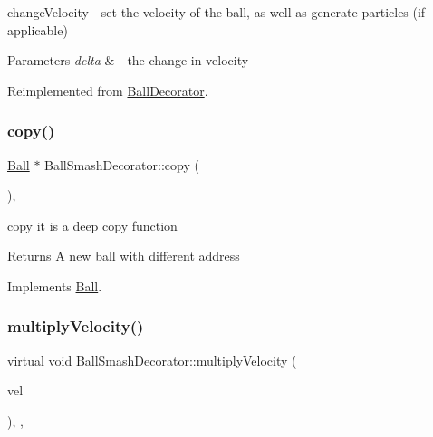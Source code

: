 change\+Velocity -\/ set the velocity of the ball, as well as generate particles (if applicable) 


\begin{DoxyParams}{Parameters}
{\em delta} & -\/ the change in velocity \\
\hline
\end{DoxyParams}


Reimplemented from \mbox{\hyperlink{class_ball_decorator_a3e4f4d31f6409f018b8b337bcf2bd284}{Ball\+Decorator}}.

\mbox{\label{class_ball_smash_decorator_ab5efc4c2f676224223940a7a4f7dcd77}} 
\subsubsection{\texorpdfstring{copy()}{copy()}}
{\footnotesize\ttfamily \mbox{\hyperlink{class_ball}{Ball}} $\ast$ Ball\+Smash\+Decorator\+::copy (\begin{DoxyParamCaption}{ }\end{DoxyParamCaption})\hspace{0.3cm}{\ttfamily [override]}, {\ttfamily [virtual]}}



copy it is a deep copy function 

\begin{DoxyReturn}{Returns}
A new ball with different address 
\end{DoxyReturn}


Implements \mbox{\hyperlink{class_ball_ae6c0731fabb7a45ba36df62a1975661a}{Ball}}.

\mbox{\label{class_ball_smash_decorator_a017998926f2b3ebdfcf49e074ea86aae}} 
\subsubsection{\texorpdfstring{multiply\+Velocity()}{multiplyVelocity()}}
{\footnotesize\ttfamily virtual void Ball\+Smash\+Decorator\+::multiply\+Velocity (\begin{DoxyParamCaption}\item[{const Q\+Vector2D \&}]{vel }\end{DoxyParamCaption})\hspace{0.3cm}{\ttfamily [inline]}, {\ttfamily [override]}, {\ttfamily [virtual]}}



